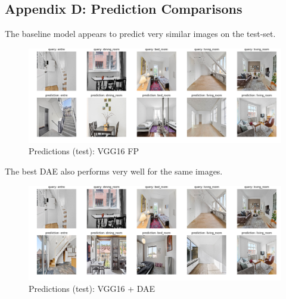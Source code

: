 \subsection*{Appendix D: Prediction Comparisons} \label{appendix: D}
The baseline model appears to predict very similar images on the test-set. 
\begin{figure}[H]
    \centering
      \includegraphics[width=\textwidth]{pictures/plots/vgg16purepred}
      \caption{Predictions (test): VGG16 FP}
      \label{fig:vggpure}
\end{figure}

The best DAE also performs very well for the same images.
\begin{figure}[H]
    \centering
      \includegraphics[width=\textwidth]{pictures/plots/vggdaepred}
      \caption{Predictions (test): VGG16 + DAE}
      \label{fig:vggdae}
\end{figure}